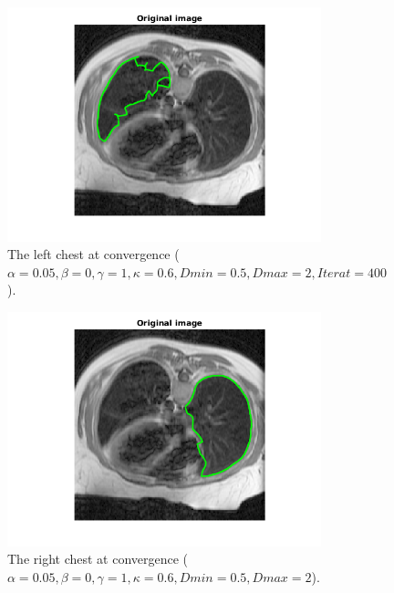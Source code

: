 \documentclass{article}
\begin{document}
\begin{figure}[h!]
\centering
\begin{subfigure}{0.49\textwidth}
  \centering
  \includegraphics[width=\linewidth]{chestLeftclassical.png}
  \caption{The left chest at convergence ($\alpha=0.05, \beta=0, \gamma=1,\kappa=0.6,Dmin=0.5,Dmax=2,Iterat=400$).}
  \label{fig4a}
\end{subfigure}
\begin{subfigure}{0.49\textwidth}
  \centering
  \includegraphics[width=\linewidth]{chestRightclassical.png}
  \caption{The right chest at convergence ($\alpha=0.05, \beta=0, \gamma=1,\kappa=0.6,Dmin=0.5,Dmax=2$).}
  \label{fig4b}
\end{subfigure}
\begin{subfigure}{0.49\textwidth}

\end{subfigure}
\end{figure}
\end{document}
